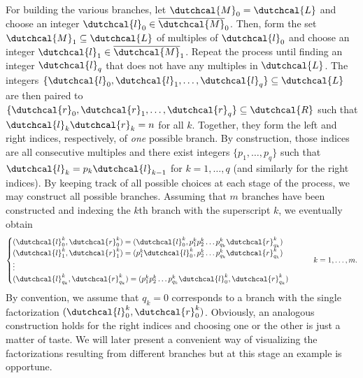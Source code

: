 \documentclass{article}
\numberwithin{equation}{section}
\newcommand{\lcal}{\dutchcal{l}}
\newcommand{\rcal}{\dutchcal{r}}
\theoremstyle{definition}
\begin{document}
For building the various branches, let $\dutchcal{M}_0=\dutchcal{L}$ and choose an integer $\lcal_0 \in \overline{\dutchcal{M}}_0$. Then, form the set $\dutchcal{M}_1 \subseteq \dutchcal{L}$ of multiples of $\lcal_0$ and choose an integer $\lcal_1 \in \overline{\dutchcal{M}}_1$. Repeat the process until finding an integer $\lcal_q$ that does not have any multiples in $\dutchcal{L}$. The integers $\{\lcal_0,\lcal_1,\dots,\lcal_q\} \subseteq \dutchcal{L}$ are then paired to $\{\rcal_0,\rcal_1,\dots,\rcal_q\} \subseteq \dutchcal{R}$ such that $\lcal_k\rcal_k=n$ for all $k$. Together, they form the left and right indices, respectively, of \emph{one} possible branch. By construction, those indices are all consecutive multiples and there exist integers $\{p_1,\dots,p_q\}$ such that $\lcal_k=p_k \lcal_{k-1}$ for $k=1,\dots,q$ (and similarly for the right indices). By keeping track of all possible choices at each stage of the process, we may construct all possible branches. Assuming that $m$ branches have been constructed and indexing the $k$th branch with the superscript $k$, we eventually obtain
\begin{equation*}
    \begin{cases}
        (\lcal_0^k,\rcal_0^k) =(\lcal_0^k, p_1^kp_2^k\dots p_{q_k}^k \rcal_{q_k}^k) \\
        (\lcal_1^k,\rcal_1^k) =(p_1^k\lcal_0^k, p_2^k\dots p_{q_k}^k \rcal_{q_k}^k) \\
        \vdots \\
        (\lcal_{q_k}^k,\rcal_{q_k}^k) =(p_1^k p_2^k \dots p_{q_k}^k \lcal_0^k, \rcal_{q_k}^k)
    \end{cases}
    \qquad k=1,\dots,m.
\end{equation*}
By convention, we assume that $q_k=0$ corresponds to a branch with the single factorization $(\lcal_0^k,\rcal_0^k)$. Obviously, an analogous construction holds for the right indices and choosing one or the other is just a matter of taste. We will later present a convenient way of visualizing the factorizations resulting from different branches but at this stage an example is opportune. 
\end{document}
